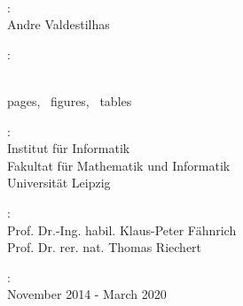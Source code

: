 \thispagestyle{empty}

\hfill

\vfill

\noindent{}\\


\noindent{}:\\
Andre Valdestilhas %

\medskip

\noindent{}:\\
\emph{\myTitle}

\medskip

\noindent{} \\ 
\pageref{LastPage} pages, \totfig\ figures, \tottab\ tables

\medskip

\noindent{}:\\
Institut für Informatik \\
Fakultat für Mathematik und Informatik\\
Universität Leipzig

%

\medskip

\noindent{}:\\
Prof. Dr.-Ing. habil. Klaus-Peter Fähnrich \\
Prof. Dr. rer. nat. Thomas Riechert

\medskip

\noindent{}:\\
November 2014 - March 2020

\medskip

